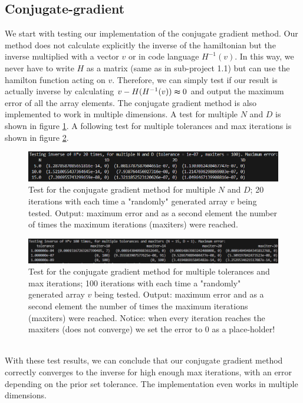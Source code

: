 \documentclass[11pt, letterpaper, onecolumn]{article}
\begin{document}
	\subsection{Conjugate-gradient}
	We start with testing our implementation of the conjugate gradient method. Our method does not calculate explicitly the inverse of the hamiltonian but the inverse multiplied with a vector $v$ or in code language $H^{-1}(v)$. In this way, we never have to write $H$ as a matrix (same as in sub-project 1.1) but can use the hamilton function acting on $v$. Therefore, we can simply test if our result is actually inverse by calculating $v-H(H^{-1}(v))\thickapprox 0$ and output the maximum error of all the array elements. The conjugate gradient method is also implemented to work in multiple dimensions. A test for multiple $N$ and $D$ is shown in figure \ref{fig:test_inverse-ND}. A following test for multiple tolerances and max iterations is shown in figure \ref{fig:test_inverse-tol}.
	\begin{figure} [H] 
	\begin{center}	
	\includegraphics[width=17cm]{"test_inverse_ND2 better.png"}
	\caption{Test for the conjugate gradient method for multiple $N$ and $D$; 20 iterations with each time a "randomly" generated array $v$ being tested. Output: maximum error and as a second element the number of times the maximum iterations (maxiters) were reached.} \label{fig:test_inverse-ND}
	\end{center}
	\end{figure}
	\begin{figure} [H] 
	\begin{center}	
	\includegraphics[width=19cm]{"test_inverse_tolMax.png"}
	\caption{Test for the conjugate gradient method for multiple tolerances and max iterations; 100 iterations with each time a "randomly" generated array $v$ being tested. Output: maximum error and as a second element the number of times the maximum iterations (maxiters) were reached. Notice: when every iteration reaches the maxiters (does not converge) we set the error to 0 as a place-holder!} \label{fig:test_inverse-tol}
	\end{center}
	\end{figure}
	\\
	With these test results, we can conclude that our conjugate gradient method correctly converges to the inverse for high enough max iterations, with an error depending on the prior set tolerance. The implementation even works in multiple dimensions.
	
\end{document}

